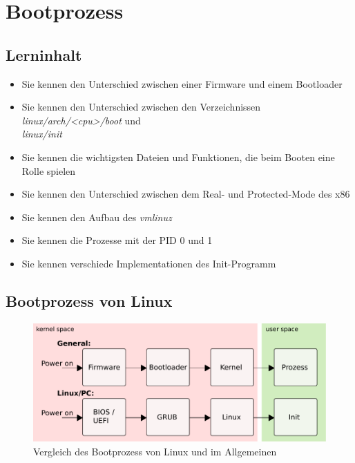 \section{Bootprozess}

\subsection{Lerninhalt}

\begin{itemize}
   \item Sie kennen den Unterschied zwischen einer Firmware und einem Bootloader
   \item Sie kennen den Unterschied zwischen den Verzeichnissen \emph{linux/arch/<cpu>/boot} und \\ \emph{linux/init}
   \item Sie kennen die wichtigsten Dateien und Funktionen, die beim Booten eine Rolle spielen
   \item Sie kennen den Unterschied zwischen dem Real- und Protected-Mode des x86
   \item Sie kennen den Aufbau des \emph{vmlinuz}
   \item Sie kennen die Prozesse mit der PID 0 und 1
   \item Sie kennen verschiede Implementationen des Init-Programm
\end{itemize}

\subsection{Bootprozess von Linux}

\begin{figure}[h!]
   \begin{center}
      \includegraphics{images/boot_linux}
   \end{center}
   \caption{Vergleich des Bootprozess von Linux und im Allgemeinen}
   \label{fig:cmpbootlinux}
\end{figure}

